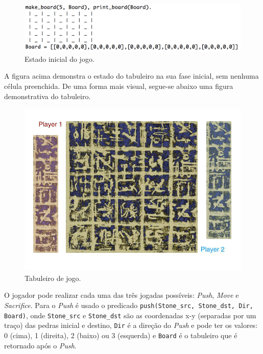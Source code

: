 \documentclass[a4paper]{article}
\begin{document}
\begin{figure}[!htb]
	\centering
	\includegraphics[scale=0.6]{images/make_board.png}
	\caption{Estado inicial do jogo.}
\end{figure}

A figura acima demonstra o estado do tabuleiro na sua fase inicial, sem nenhuma célula preenchida. De uma forma mais visual, segue-se abaixo uma figura demonstrativa do tabuleiro.

\begin{figure}[!htb]
	\centering
	\includegraphics[scale=0.3]{images/board.png}
	\caption{Tabuleiro de jogo.}
\end{figure}

O jogador pode realizar cada uma das três jogadas possíveis: \textit{Push}, \textit{Move} e \textit{Sacrifice}. Para o \textit{Push} é usado o predicado \texttt{push(Stone\_src, Stone\_dst, Dir, Board)}, onde \texttt{Stone\_src} e \texttt{Stone\_dst} são as coordenadas x-y (separadas por um traço) das pedras inicial e destino, \texttt{Dir} é a direção do \textit{Push} e pode ter os valores: 0 (cima), 1 (direita), 2 (baixo) ou 3 (esquerda) e \texttt{Board} é o tabuleiro que é retornado após o \textit{Push}.
\end{document}
